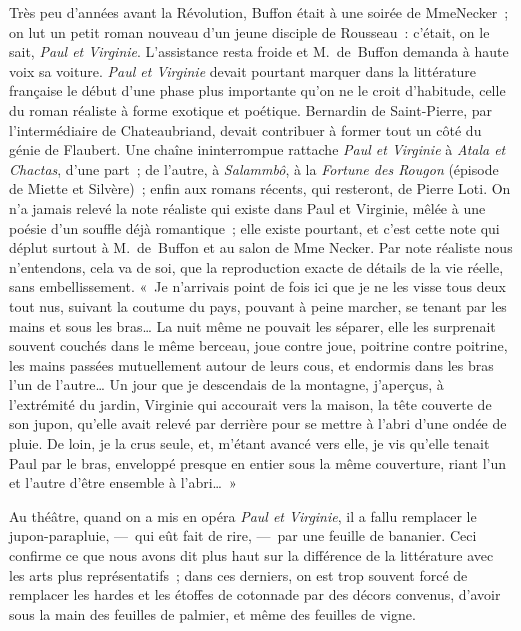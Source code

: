 \documentclass[french,twoside]{book} %
\begin{document}
Très peu d’années avant la Révolution, Buffon était à une soirée de MmeNecker ; on lut un petit roman nouveau d’un jeune disciple de Rousseau : c’était, on le sait, \emph{Paul et Virginie}. L’assistance resta froide et M. de Buffon demanda à haute voix sa voiture. \emph{Paul et Virginie} devait pourtant marquer dans la littérature française le début d’une phase plus importante qu’on ne le croit d’habitude, celle du roman réaliste à forme exotique et poétique. Bernardin de Saint-Pierre, par l’intermédiaire de Chateaubriand, devait contribuer à former tout un côté du génie de Flaubert. Une chaîne ininterrompue rattache \emph{Paul et Virginie} à \emph{Atala et Chactas}, d’une part ; de l’autre, à \emph{Salammbô}, à la \emph{Fortune des Rougon} (épisode de Miette et Silvère) ; enfin aux romans récents, qui resteront, de Pierre Loti. On n’a jamais relevé la note réaliste qui existe dans Paul et Virginie, mêlée à une poésie d’un souffle déjà romantique ; elle existe pourtant, et c’est cette note qui déplut surtout à M. de Buffon et au salon de Mme Necker. Par note réaliste nous n’entendons, cela va de soi, que la reproduction exacte de détails de la vie réelle, sans embellissement. « Je n’arrivais point de fois ici que je ne les visse tous deux tout nus, suivant la coutume du pays, pouvant à peine marcher, se tenant par les mains et sous les bras… La nuit même ne pouvait les séparer, elle les surprenait souvent couchés dans le même berceau, joue contre joue, poitrine contre poitrine, les mains passées mutuellement autour de leurs cous, et endormis dans les bras l’un de l’autre… Un jour que je descendais de la montagne, j’aperçus, à l’extrémité du jardin, Virginie qui accourait vers la maison, la tête couverte de son jupon, qu’elle avait relevé par derrière pour se mettre à l’abri d’une ondée de pluie. De loin, je la crus seule, et, m’étant avancé vers elle, je vis qu’elle tenait Paul par le bras, enveloppé presque en entier sous la même couverture, riant l’un et l’autre d’être ensemble à l’abri… »\par
Au théâtre, quand on a mis en opéra \emph{Paul et Virginie}, il a fallu remplacer le jupon-parapluie, — qui eût fait de rire, — par une feuille de bananier. Ceci confirme ce que nous avons dit plus haut sur la différence de la littérature avec les arts plus représentatifs ; dans ces derniers, on est trop souvent forcé de remplacer les hardes et les étoffes de cotonnade par des décors convenus, d’avoir sous la main des feuilles de palmier, et même des feuilles de vigne.\par
\end{document}
